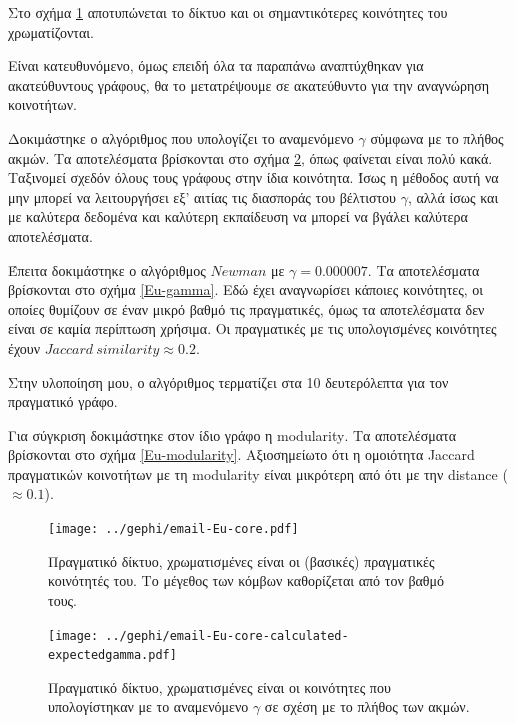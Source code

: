 \documentclass[12pt, letterpaper]{article}
\begin{document}
Στο σχήμα \ref{Eu-real} αποτυπώνεται το δίκτυο και οι σημαντικότερες κοινότητες του 
χρωματίζονται.


Είναι κατευθυνόμενο, όμως επειδή όλα τα παραπάνω αναπτύχθηκαν για ακατεύθυντους γράφους,
θα το μετατρέψουμε σε ακατεύθυντο για την αναγνώρηση κοινοτήτων.


Δοκιμάστηκε ο αλγόριθμος που υπολογίζει το αναμενόμενο $\gamma$ σύμφωνα με το πλήθος 
ακμών. Τα αποτελέσματα βρίσκονται στο σχήμα \ref{Eu-expected}, όπως φαίνεται είναι πολύ κακά.
Ταξινομεί σχεδόν όλους τους γράφους στην ίδια κοινότητα.
Ίσως η μέθοδος αυτή να μην μπορεί να λειτουργήσει εξ' αιτίας τις διασποράς του βέλτιστου 
$\gamma$, αλλά ίσως και με καλύτερα δεδομένα και καλύτερη εκπαίδευση να μπορεί να βγάλει καλύτερα
αποτελέσματα.


Έπειτα δοκιμάστηκε ο αλγόριθμος $Newman$ με $\gamma = 0.000007$. Τα αποτελέσματα βρίσκονται 
στο σχήμα \ref{Eu-gamma}. Εδώ έχει αναγνωρίσει κάποιες κοινότητες, οι οποίες θυμίζουν σε έναν 
μικρό βαθμό τις πραγματικές, όμως τα αποτελέσματα δεν είναι σε καμία περίπτωση 
χρήσιμα. Οι πραγματικές με τις υπολογισμένες κοινότητες έχουν $Jaccard \ similarity \approx 0.2$.

Στην υλοποίηση μου, ο αλγόριθμος τερματίζει στα 10 δευτερόλεπτα για τον πραγματικό γράφο.

Για σύγκριση δοκιμάστηκε στον ίδιο γράφο η \textlatin{modularity}. Τα αποτελέσματα βρίσκονται στο σχήμα 
\ref{Eu-modularity}.
Αξιοσημείωτο ότι η ομοιότητα \textlatin{Jaccard} πραγματικών κοινοτήτων με τη \textlatin{modularity} είναι μικρότερη 
από ότι με την \textlatin{distance} ($\approx 0.1$). 






  

\begin{figure}
  \centering
  \texttt{[image: ../gephi/email-Eu-core.pdf]}
  \caption{Πραγματικό δίκτυο, χρωματισμένες είναι οι (βασικές) πραγματικές κοινότητές του.
  Το μέγεθος των κόμβων καθορίζεται από τον βαθμό τους.}
  \label{Eu-real}
\end{figure}


\begin{figure}
  \centering
  \texttt{[image: ../gephi/email-Eu-core-calculated-expectedgamma.pdf]}
  \caption{Πραγματικό δίκτυο, χρωματισμένες είναι οι κοινότητες που υπολογίστηκαν με το 
  αναμενόμενο $\gamma$ σε σχέση με το πλήθος των ακμών.}
  \label{Eu-expected}
\end{figure}
\end{document}
